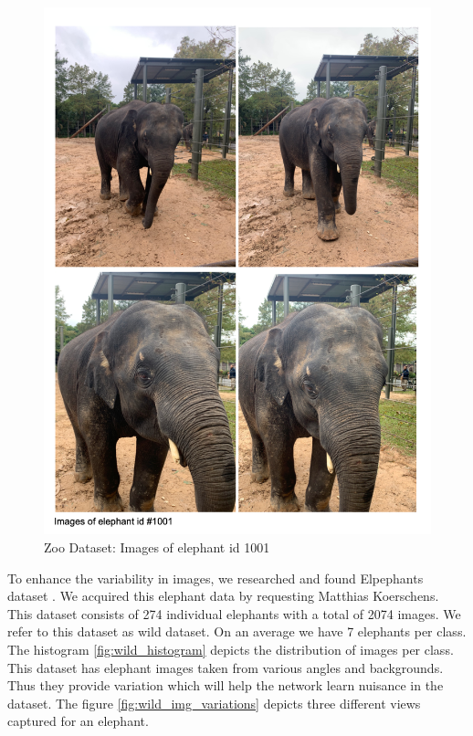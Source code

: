 \documentclass[10pt,twocolumn,letterpaper]{article}
\begin{document}
\begin{figure}[t]
  \centering
  \includegraphics[scale=0.40]{img_variations}
   \caption{Zoo Dataset: Images of elephant id 1001}
   \label{fig:img_variations}
\end{figure}


To enhance the variability in images, we researched and found Elpephants dataset \cite{Elpephants}. We acquired this elephant data by requesting Matthias Koerschens. This dataset consists of 274 individual elephants with a total of 2074 images. We refer to this dataset as wild dataset. On an average we have 7 elephants per class. The histogram \ref{fig:wild_histogram} depicts the distribution of images per class. This dataset has elephant images taken from various angles and backgrounds. Thus they provide variation which will help the network learn nuisance in the dataset. The figure \ref{fig:wild_img_variations} depicts three different views captured for an elephant.
\end{document}

